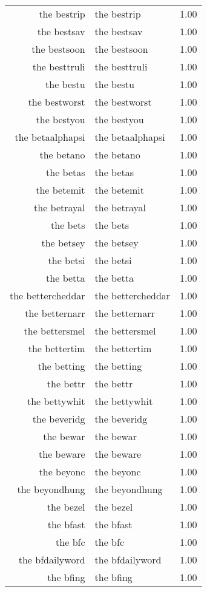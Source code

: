 \begin{table}[ht]
\begin{tabular}{rlr}
  the bestrip & the bestrip & 1.00 \\ 
  the bestsav & the bestsav & 1.00 \\ 
  the bestsoon & the bestsoon & 1.00 \\ 
  the besttruli & the besttruli & 1.00 \\ 
  the bestu & the bestu & 1.00 \\ 
  the bestworst & the bestworst & 1.00 \\ 
  the bestyou & the bestyou & 1.00 \\ 
  the betaalphapsi & the betaalphapsi & 1.00 \\ 
  the betano & the betano & 1.00 \\ 
  the betas & the betas & 1.00 \\ 
  the betemit & the betemit & 1.00 \\ 
  the betrayal & the betrayal & 1.00 \\ 
  the bets & the bets & 1.00 \\ 
  the betsey & the betsey & 1.00 \\ 
  the betsi & the betsi & 1.00 \\ 
  the betta & the betta & 1.00 \\ 
  the bettercheddar & the bettercheddar & 1.00 \\ 
  the betternarr & the betternarr & 1.00 \\ 
  the bettersmel & the bettersmel & 1.00 \\ 
  the bettertim & the bettertim & 1.00 \\ 
  the betting & the betting & 1.00 \\ 
  the bettr & the bettr & 1.00 \\ 
  the bettywhit & the bettywhit & 1.00 \\ 
  the beveridg & the beveridg & 1.00 \\ 
  the bewar & the bewar & 1.00 \\ 
  the beware & the beware & 1.00 \\ 
  the beyonc & the beyonc & 1.00 \\ 
  the beyondhung & the beyondhung & 1.00 \\ 
  the bezel & the bezel & 1.00 \\ 
  the bfast & the bfast & 1.00 \\ 
  the bfc & the bfc & 1.00 \\ 
  the bfdailyword & the bfdailyword & 1.00 \\ 
  the bfing & the bfing & 1.00 \\ 

\end{tabular}
\end{table}
